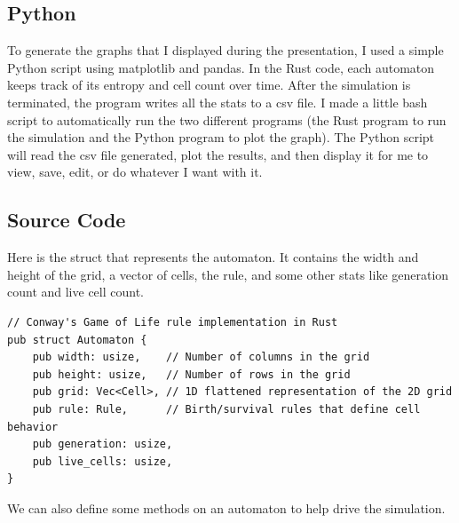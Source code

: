 \documentclass[12pt]{article}
\begin{document}
\subsection{Python}
To generate the graphs that I displayed during the presentation, I used a simple Python script using matplotlib and pandas. In the Rust code, each automaton keeps track of its entropy and cell count over time. After the simulation is terminated, the program writes all the stats to a csv file. I made a little bash script to automatically run the two different programs (the Rust program to run the simulation and the Python program to plot the graph). The Python script will read the csv file generated, plot the results, and then display it for me to view, save, edit, or do whatever I want with it.

\subsection{Source Code}
Here is the struct that represents the automaton. It contains the width and height of the grid, a vector of cells, the rule, and some other stats like generation count and live cell count.
\begin{singlespace}
	\begin{verbatim}
// Conway's Game of Life rule implementation in Rust
pub struct Automaton {
    pub width: usize,    // Number of columns in the grid
    pub height: usize,   // Number of rows in the grid
    pub grid: Vec<Cell>, // 1D flattened representation of the 2D grid
    pub rule: Rule,      // Birth/survival rules that define cell behavior
    pub generation: usize,
    pub live_cells: usize,
}
\end{verbatim}
\end{singlespace}
We can also define some methods on an automaton to help drive the simulation.
\end{document}
